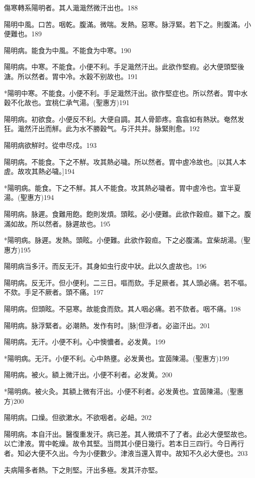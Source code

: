 \documentclass[12pt,twoside,UTF8,b5paper]{ctexbook}
\begin{document}
傷寒轉系陽明者。其人濈濈然微汗出也。188

陽明中風。口苦。咽乾。腹滿。微喘。发熱。惡寒。脉浮緊。若下之。則腹滿。小便難也。189

陽明病。能食为中風。不能食为中寒。190

陽明病。中寒。不能食。小便不利。手足濈然汗出。此欲作堅瘕。必大便頭堅後溏。所以然者。胃中冷。水穀不别故也。191

*陽明中寒。不能食。小便不利。手足濈然汗出。欲作堅症也。所以然者。胃中水穀不化故也。宜桃仁承气湯。(聖惠方)191

陽明病。初欲食。小便反不利。大便自調。其人骨節疼。翕翕如有熱狀。奄然发狂。濈然汗出而觧。此为水不勝穀气。与汗共并。脉緊則愈。192

陽明病欲觧时。從申尽戍。193

陽明病。不能食。下之不觧。攻其熱必噦。所以然者。胃中虗冷故也。[以其人本虗。故攻其熱必噦。]194

*陽明病。能食。下之不觧。其人不能食。攻其熱必噦者。胃中虗冷也。宜半夏湯。(聖惠方)194

陽明病。脉遲。食難用飽。飽則发煩。頭眩。必小便難。此欲作穀疸。雖下之。腹滿如故。所以然者。脉遲故也。195

*陽明病。脉遲。发熱。頭眩。小便難。此欲作榖疸。下之必腹滿。宜柴胡湯。(聖惠方)195

陽明病当多汗。而反无汗。其身如虫行皮中狀。此以久虗故也。196

陽明病。反无汗。但小便利。二三日。嘔而欬。手足厥者。其人頭必痛。若不嘔。不欬。手足不厥者。頭不痛。197

陽明病。但頭眩。不惡寒。故能食而欬。其人咽必痛。若不欬者。咽不痛。198

陽明病。脉浮緊者。必潮熱。发作有时。[脉]但浮者。必盜汗出。201

陽明病。无汗。小便不利。心中懊憹者。必发黄。199

*陽明病。无汗。小便不利。心中熱壅。必发黄也。宜茵陳湯。(聖惠方)199

陽明病。被火。額上微汗出。小便不利者。必发黄。200

*陽明病。被火灸。其額上微有汗出。小便不利者。必发黄也。宜茵陳湯。(聖惠方)200

陽明病。口燥。但欲漱水。不欲咽者。必衄。202

陽明病。本自汗出。醫復重发汗。病已差。其人微煩不了了者。此必大便堅故也。以亡津液。胃中乾燥。故令其堅。当問其小便日幾行。若本日三四行。今日再行者。知必大便不久出。今为小便數少。津液当還入胃中。故知不久必大便也。203

夫病陽多者熱。下之則堅。汗出多極。发其汗亦堅。
\end{document}
